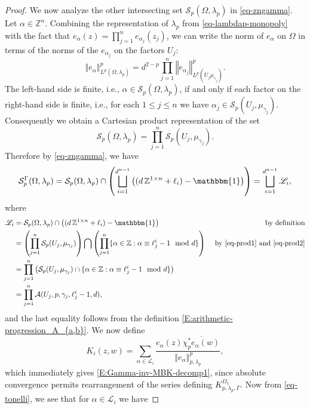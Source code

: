 \documentclass[letterpaper,11pt,reqno]{amsart}
\theoremstyle{plain}
\theoremstyle{definition}
\theoremstyle{remark}
\theoremstyle{remark}
\numberwithin{equation}{section}
\newcommand{\one}{\mathbbm{1}}
\newcommand{\norm}[1]{\left\Vert#1\right\Vert}
\newcommand{\ol}{\overline}
\newcommand{\mugj}{{\mu_{\gamma_j}}}
\newcommand{\ca}{{\mathcal A}}
\newcommand{\cs}{{\mathcal S}}
\newcommand{\Z}{{\mathbb Z}}
\begin{document}
\begin{proof}
We now analyze the other intersecting set $\cs_p(\Omega,\lambda_p)$ in \eqref{eq-zngamma}.
Let $\alpha\in \Z^n$. 
Combining the representation of $\lambda_p$ from \eqref{eq-lambdap-monopoly} with the fact that $e_\alpha(z)=\prod_{j=1}^n e_{\alpha_j}(z_j)$, we can write the norm of $e_\alpha$ on $\Omega$ in terms of the norms of the $e_{\alpha_j}$ on the factors $U_j$:
 \begin{equation}\label{eq-tonelli}
 \norm{e_\alpha}_{L^p(\Omega,\lambda_p)}^p
 = d^{2-p} \prod_{j=1}^n \norm{e_{\alpha_j}}_{L^p(U_j\mugj)}^p.
 \end{equation}
The left-hand side is finite, i.e., $\alpha\in \cs_p(\Omega, \lambda_p)$, if and only if each factor on the right-hand side is finite, i.e., for each $1\leq j \leq n$ we have $\alpha_j\in \cs_p(U_j, \mugj)$.
Consequently we obtain a Cartesian product representation of the set
\begin{equation}\label{eq-prod2}
\cs_p(\Omega, \lambda_p)=\prod_{j=1}^n \cs_p(U_j, \mugj).
\end{equation}
Therefore by \eqref{eq-zngamma}, we have
\[
\cs_p^\Gamma(\Omega,\lambda_p) 
= \cs_p(\Omega,\lambda_p)\cap 
\left(\bigsqcup_{i=1}^{d^{n-1}}\left((d\,\Z^{1 \times n}+\ell_i)-\one\right)\right)
= \bigsqcup_{i=1}^{d^{n-1}} \mathscr{L}_i,
\]
where 
\begin{align}
\mathscr{L}_i
&=  \cs_p(\Omega,\lambda_p) \cap \left((d\,\Z^{1 \times n}+\ell_i)-\one\right)
& \text{by definition}\notag\\
&= \left(\prod_{j=1}^n \cs_p(U_j, \mugj)\right)\bigcap \left(\prod_{j=1}^n\{\alpha\in \Z: \alpha\equiv \ell^i_j-1 \mod d\}\right)
&\text{ by \eqref{eq-prod1} and \eqref{eq-prod2}}\notag\\
&= \prod_{j=1}^n \left(\cs_p(U_j,\mugj)\cap
\{\alpha\in \Z: \alpha\equiv \ell^i_j-1 \mod d\} \right)\notag\\
&=  \prod_{j=1}^n \ca(U_j,p,\gamma_j,\ell^{i}_j-1,d), \label{eq-Li}
\end{align}
and the last equality follows from the definition \eqref{E:arithmetic-progression_A_{a,b}}.  
We now define
\begin{equation}\label{E:orthog-lattice-subkernel}
K_i(z,w) = \sum_{\alpha \in {\mathscr{L}}_i} \frac{e_\alpha(z) \ol{\chi_p^*e_\alpha(w)}} {\norm{e_\alpha}_{p,\lambda_p}^p},
\end{equation}
which immediately gives \eqref{E:Gamma-inv-MBK-decomp1}, since absolute convergence
permits rearrangement of the series defining $ K_{p,\lambda_p,\Gamma}^{\Omega_1}$.
Now from \eqref{eq-tonelli}, we see that for $\alpha\in \mathscr{L}_i$ we have

\end{proof}
\end{document}
